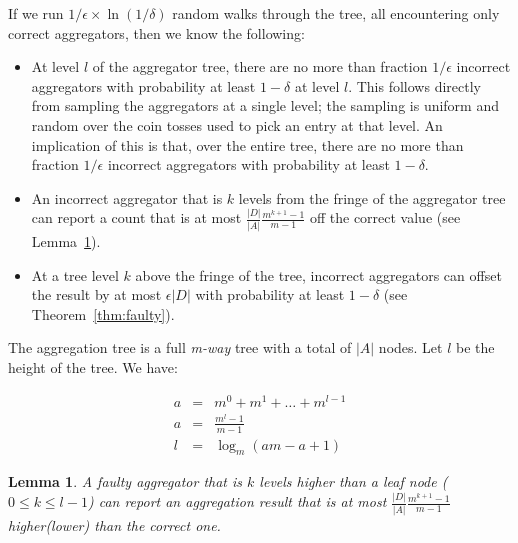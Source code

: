 \documentclass[11pt,twocolumn]{MyTightStyle}
\theoremstyle{plain}
\newtheorem{lem}[thm]{Lemma}
\theoremstyle{definition}
\theoremstyle{remark}
\numberwithin{equation}{section}
\begin{document}
If we run $1/\epsilon\times\ln(1/\delta)$ random walks through the tree,
all encountering only correct aggregators, then we know the following:
\begin{itemize}
\item At level $l$ of the aggregator tree, there are no more than
  fraction $1/\epsilon$ incorrect aggregators with probability at least
  $1-\delta$ at level $l$.  This follows directly from sampling the
  aggregators at a single level; the sampling is uniform and random over
  the coin tosses used to pick an entry at that level.  An implication
  of this is that, over the entire tree, there are no more than fraction
  $1/\epsilon$ incorrect aggregators with probability at least
  $1-\delta$.
\item An incorrect aggregator that is $k$ levels from the fringe of the
  aggregator tree can report a count that is at most
  $\frac{|D|}{|A|}\frac{m^{k+1} - 1}{m - 1}$ off the correct value (see
  Lemma~\ref{lem:offset}).
\item At a tree level $k$ above the fringe of the tree, incorrect
  aggregators can offset the result by at most $\epsilon |D|$ with
  probability at least $1-\delta$ (see
  Theorem~\ref{thm:faulty}).
\end{itemize}


The aggregation tree is a full \emph{m-way} tree with a total of
$|A|$ nodes. Let $l$ be the height of the tree. We have:

\begin{eqnarray*}
a &=& m^0 + m^1 + \ldots + m^{l-1}\\
a &=& \frac{m^l -1}{m-1}\\
l &=& \log_m(am-a+1)
\end{eqnarray*}


\begin{lem}\label{lem:offset}
A faulty aggregator that is $k$ levels higher than a leaf node ($0 \leq k
\leq l-1$) can report an aggregation result that is at most 
$\frac{|D|}{|A|}\frac{m^{k+1} -1}{m-1}$ higher(lower) than the correct one.  
\end{lem}
\end{document}
